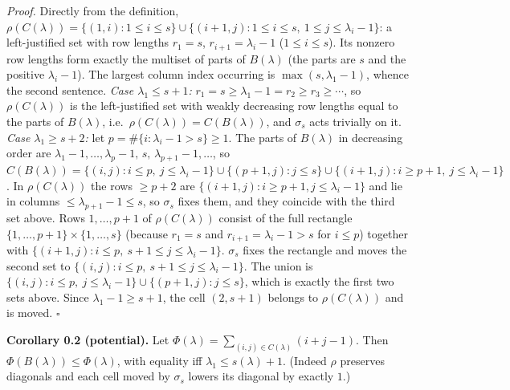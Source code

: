 \documentclass[11pt,a4paper]{article}
\begin{document}
\emph{Proof.} Directly from the definition,
\(\rho(C(\lambda))=\{(1,i):1\le i\le s\}\cup\{(i+1,j):1\le i\le s,\ 1\le j\le\lambda_i-1\}\):
a left-justified set with row lengths \(r_1=s\), \(r_{i+1}=\lambda_i-1\)
(\(1\le i\le s\)). Its nonzero row lengths form exactly the multiset of
parts of \(B(\lambda)\) (the parts are \(s\) and the positive
\(\lambda_i-1\)). The largest column index occurring is
\(\max(s,\lambda_1-1)\), whence the second sentence. \emph{Case
\(\lambda_1\le s+1\):} \(r_1=s\ge\lambda_1-1=r_2\ge r_3\ge\cdots\), so
\(\rho(C(\lambda))\) is the left-justified set with weakly decreasing
row lengths equal to the parts of \(B(\lambda)\),
i.e.~\(\rho(C(\lambda))=C(B(\lambda))\), and \(\sigma_s\) acts trivially
on it. \emph{Case \(\lambda_1\ge s+2\):} let
\(p=\#\{i:\lambda_i-1>s\}\ge1\). The parts of \(B(\lambda)\) in
decreasing order are
\(\lambda_1-1,\dots,\lambda_p-1,\,s,\,\lambda_{p+1}-1,\dots\), so
\(C(B(\lambda))=\{(i,j):i\le p,\ j\le\lambda_i-1\}\cup\{(p+1,j):j\le s\}\cup\{(i+1,j):i\ge p+1,\ j\le\lambda_i-1\}\).
In \(\rho(C(\lambda))\) the rows \(\ge p+2\) are
\(\{(i+1,j):i\ge p+1,j\le\lambda_i-1\}\) and lie in columns
\(\le\lambda_{p+1}-1\le s\), so \(\sigma_s\) fixes them, and they
coincide with the third set above. Rows \(1,\dots,p+1\) of
\(\rho(C(\lambda))\) consist of the full rectangle
\(\{1,\dots,p+1\}\times\{1,\dots,s\}\) (because \(r_1=s\) and
\(r_{i+1}=\lambda_i-1>s\) for \(i\le p\)) together with
\(\{(i+1,j):i\le p,\ s+1\le j\le\lambda_i-1\}\). \(\sigma_s\) fixes the
rectangle and moves the second set to
\(\{(i,j):i\le p,\ s+1\le j\le\lambda_i-1\}\). The union is
\(\{(i,j):i\le p,\ j\le\lambda_i-1\}\cup\{(p+1,j):j\le s\}\), which is
exactly the first two sets above. Since \(\lambda_1-1\ge s+1\), the cell
\((2,s+1)\) belongs to \(\rho(C(\lambda))\) and is moved. \(\square\)

\textbf{Corollary 0.2 (potential).} Let
\(\Phi(\lambda)=\sum_{(i,j)\in C(\lambda)}(i+j-1)\). Then
\(\Phi(B(\lambda))\le\Phi(\lambda)\), with equality iff
\(\lambda_1\le s(\lambda)+1\). (Indeed \(\rho\) preserves diagonals and
each cell moved by \(\sigma_s\) lowers its diagonal by exactly \(1\).)
\end{document}
